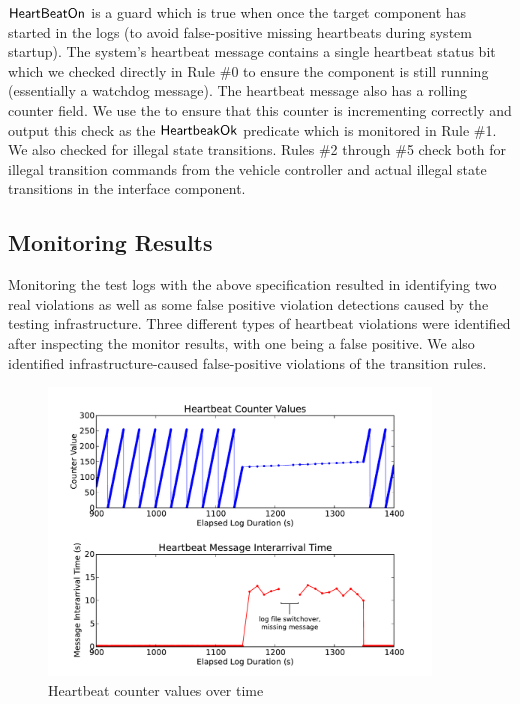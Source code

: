 $\mathsf{HeartBeatOn}$ is a guard which is true when once the target component has started in the logs (to avoid false-positive missing heartbeats during system startup). 
The system's heartbeat message contains a single heartbeat status bit which we checked directly in Rule \#0 to ensure the component is still running (essentially a watchdog message). 
The heartbeat message also has a rolling counter field. 
We use the \sfmap to ensure that this counter is incrementing correctly and output this check as the $\mathsf{HeartbeakOk}$ predicate which is monitored in Rule \#1.
We also checked for illegal state transitions. Rules \#2 through \#5 check both for illegal transition commands from the vehicle controller and actual illegal state transitions in the interface component.


\subsection{Monitoring Results}
Monitoring the test logs with the above specification resulted in identifying two real violations as well as some false positive violation detections caused by the testing infrastructure.
%
Three different types of heartbeat violations were identified after inspecting the monitor results, with one being a false positive.
We also identified infrastructure-caused false-positive violations of the transition rules.

\begin{figure}[htbp]
		\centering
		\includegraphics[width=4.0in]{img/hb1}
		\caption{Heartbeat counter values over time}
		\label{fig:hb_arrival}
\end{figure}

